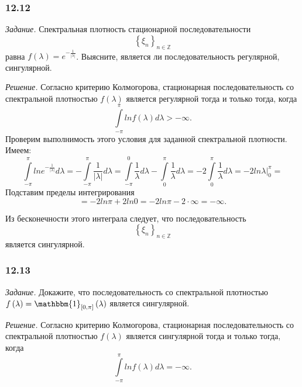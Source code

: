 \subsubsection*{12.12}

\textit{Задание.}
Спектральная плотность стационарной последовательности
\begin{equation*}
  \left\{ \xi_n \right\}_{n \in \mathbb{Z}}
\end{equation*}
равна $f \left( \lambda \right) = e^{-\frac{1}{ \left| \lambda \right| }}$.
Выясните, является ли последовательность регулярной, сингулярной.

\textit{Решение.}
Согласно критерию Колмогорова,
стационарная последовательность со спектральной плотностью $f \left( \lambda \right) $
является регулярной тогда и только тогда, когда
\begin{equation*}
  \int \limits_{-\pi }^{ \pi } ln f \left( \lambda \right) d \lambda >
  -\infty.
\end{equation*}
Проверим выполнимость этого условия для заданной спектральной плотности.
Имеем:
\begin{equation*}
  \int \limits_{-\pi }^{ \pi } ln e^{-\frac{1}{ \left| \lambda \right| }} d \lambda =
  -\int \limits_{-\pi }^{ \pi } \frac{1}{ \left| \lambda \right| } d \lambda =
  \int \limits_{-\pi }^0 \frac{1}{ \lambda } d \lambda -
  \int \limits_0^{ \pi } \frac{1}{ \lambda } d \lambda =
  -2 \int \limits_0^{ \pi } \frac{1}{ \lambda } d \lambda =
  -2 \left. ln \lambda \right|_0^{ \pi } =
\end{equation*}
Подставим пределы интегрирования
\begin{equation*}
  = -2 ln \pi + 2 ln 0 =
  -2 ln \pi - 2 \cdot \infty =
  -\infty.
\end{equation*}

Из бесконечности этого интеграла следует,
что последовательность
\begin{equation*}
  \left\{ \xi_n \right\}_{n \in \mathbb{Z}}
\end{equation*}
является сингулярной.

\subsubsection*{12.13}

\textit{Задание.}
Докажите, что последовательность со спектральной плотностью
$f \left( \lambda \right) =
  \mathbbm{1}_{ \left[ 0, \pi \right] } \left( \lambda \right) $
является сингулярной.

\textit{Решение.}
Согласно критерию Колмогорова,
стационарная последовательность со спектральной плотностью $f \left( \lambda \right) $
является сингулярной тогда и только тогда, когда
\begin{equation*}
  \int \limits_{-\pi }^{ \pi } ln f \left( \lambda \right) d \lambda =
  -\infty.
\end{equation*}

